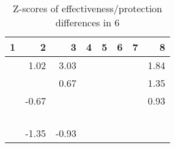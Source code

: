 \begin{table}[ht]
\centering
\begin{tabular}{rrrrrrrr}
  \hline
1 & 2 & 3 & 4 & 5 & 6 & 7 & 8 \\ 
  \hline
 & 1.02 & 3.03 &  &  &  &  & 1.84 \\ 
   &  & 0.67 &  &  &  &  & 1.35 \\ 
   & -0.67 &  &  &  &  &  & 0.93 \\ 
   &  &  &  &  &  &  &  \\ 
   &  &  &  &  &  &  &  \\ 
   &  &  &  &  &  &  &  \\ 
   &  &  &  &  &  &  &  \\ 
   & -1.35 & -0.93 &  &  &  &  &  \\ 
   \hline
\end{tabular}
\caption{Z-scores of effectiveness/protection differences in  6} 
\end{table}
